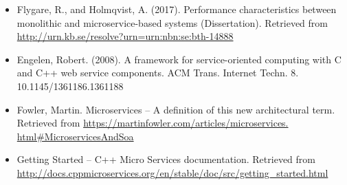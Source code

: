 \begin{itemize}
\item
Flygare, R., and Holmqvist, A. (2017). Performance characteristics between monolithic and microservice-based systems (Dissertation). Retrieved from \url{http://urn.kb.se/resolve?urn=urn:nbn:se:bth-14888}


\item
Engelen, Robert. (2008). A framework for service-oriented computing with C and C++ web service components. ACM Trans. Internet Techn. 8. 10.1145/1361186.1361188


\item
Fowler, Martin. Microservices – A definition of this new architectural term. Retrieved from \url{https://martinfowler.com/articles/microservices.
html#MicroservicesAndSoa}

\item
Getting Started – C++ Micro Services documentation. Retrieved from \url{http://docs.cppmicroservices.org/en/stable/doc/src/getting_started.html}
\end{itemize}